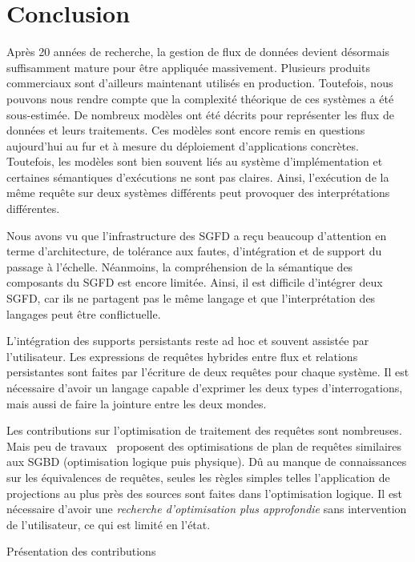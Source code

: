 \section{Conclusion}\label{sec:rw:sgfd:synthese}
Après 20 années de recherche, la gestion de flux de données devient désormais suffisamment mature pour être appliquée massivement. Plusieurs produits commerciaux sont d'ailleurs maintenant utilisés en production. Toutefois, nous pouvons nous rendre compte que la complexité théorique de ces systèmes a été sous-estimée. De nombreux modèles ont été décrits pour représenter les flux de données et leurs traitements. Ces modèles sont encore remis en questions aujourd'hui au fur et à mesure du déploiement d'applications concrètes. Toutefois, les modèles sont bien souvent liés au système d'implémentation et certaines sémantiques d'exécutions ne sont pas claires. Ainsi, l'exécution de la même requête sur deux systèmes différents peut provoquer des interprétations différentes.

Nous avons vu que l'infrastructure des SGFD a reçu beaucoup d'attention en terme d'architecture, de tolérance aux fautes, d'intégration et de support du passage à l'échelle. Néanmoins, la compréhension de la sémantique des composants du SGFD est encore limitée. Ainsi, il est difficile d'intégrer deux SGFD, car ils ne partagent pas le même langage et que l'interprétation des langages peut être conflictuelle.

L'intégration des supports persistants reste ad hoc et souvent assistée par l'utilisateur. Les expressions de requêtes hybrides entre flux et relations persistantes sont faites par l'écriture de deux requêtes pour chaque système. Il est nécessaire d'avoir un langage capable d'exprimer les deux types d'interrogations, mais aussi de faire la jointure entre les deux mondes.

Les contributions sur l'optimisation de traitement des requêtes sont nombreuses. Mais peu de travaux~\cite{Galpin:snee,Kramer:semantics} proposent des optimisations de plan de requêtes similaires aux SGBD (optimisation logique puis physique). Dû au manque de connaissances sur les équivalences de requêtes, seules les règles simples telles l'application de projections au plus près des sources sont faites dans l'optimisation logique. Il est nécessaire d'avoir une \textit{recherche d'optimisation plus approfondie} sans intervention de l'utilisateur, ce qui est limité en l'état.

\newpage
\quad

\vspace{2.3\baselineskip}
\begin{flushright} \huge Présentation des contributions \end{flushright}
\vspace{1.7\baselineskip}

